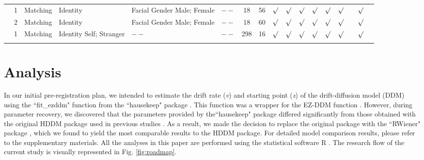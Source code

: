 \documentclass[sn-apa]{sn-jnl}%
\theoremstyle{thmstyleone}%
\theoremstyle{thmstyletwo}%
\theoremstyle{thmstylethree}%
\begin{document}
\begin{table}
\begin{tabular*}{\textwidth}{@{\extracolsep\fill}lccp{1cm}p{1cm}cccccccccccc}
		\textcite{wozniak2018prioritization} & 1 & Matching & Identity\centering & Facial Gender Male; Female\centering & $--$ & 18 & 56 & $\surd$ & $\surd$ & $\surd$ & $\surd$  & $\surd$ & $\surd$ & & $\surd$ \\
		& 2 & Matching & Identity\centering & Facial Gender Male; Female\centering & $--$ & 18 & 60 & $\surd$ & $\surd$ & $\surd$ & $\surd$  & $\surd$ & $\surd$ & & $\surd$ \\  
		\textcite{liu2023to} & 1 & Matching & Identity Self; Stranger\centering & $--$\centering & $--$ & 298 & 16 & $\surd$ & $\surd$ & $\surd$ & $\surd$  & $\surd$ & $\surd$ & & $\surd$ \\
		\botrule
	\end{tabular*}
\end{table}


\section{Analysis}\label{sec:analysis}

In our initial pre-registration plan, we intended to estimate the drift rate (\textit{\textit{v}}) and starting point (\textit{z}) of the drift-diffusion model (DDM) using the ``fit\_ezddm" function from the ``hausekeep" package \parencite{lin2020strong}. This function was a wrapper for the EZ-DDM function \parencite{wagenmakers2007an}. However, during parameter recovery, we discovered that the parameters provided by the``hausekeep" package differed significantly from those obtained with the original HDDM package \parencite{wiecki2013hddm} used in previous studies \parencite{golubickis2017self}. As a result, we made the decision to replace the original package with the ``RWiener" package \parencite{wabersich2014rwiener}, which we found to yield the most comparable results to the HDDM package. For detailed model comparison results, please refer to the supplementary materials. All the analyses in this paper are performed using the statistical software R \parencite{dalgaard2010r}. The research flow of the current study is visually represented in Fig. \ref{fig:roadmap}. 
\end{document}

